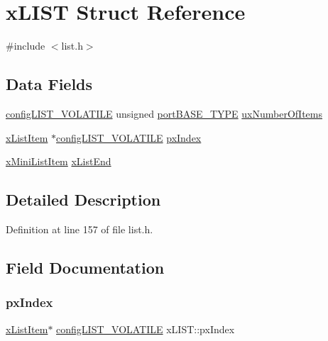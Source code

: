 \hypertarget{structxLIST}{}\section{x\+L\+I\+ST Struct Reference}
\label{structxLIST}


{\ttfamily \#include $<$list.\+h$>$}

\subsection*{Data Fields}
\begin{DoxyCompactItemize}
\item 
\hyperlink{list_8h_a2d5de557c5561c8980d1bf51d87d8cba}{config\+L\+I\+S\+T\+\_\+\+V\+O\+L\+A\+T\+I\+LE} unsigned \hyperlink{portmacro_8h_a1ebe82d24d764ae4e352f7c3a9f92c01}{port\+B\+A\+S\+E\+\_\+\+T\+Y\+PE} \hyperlink{structxLIST_a268fd44743a3b6d3cd4dd36a72a678fa}{ux\+Number\+Of\+Items}
\item 
\hyperlink{list_8h_abc3e65a10b5c5f39142e64e69311797f}{x\+List\+Item} $\ast$\hyperlink{list_8h_a2d5de557c5561c8980d1bf51d87d8cba}{config\+L\+I\+S\+T\+\_\+\+V\+O\+L\+A\+T\+I\+LE} \hyperlink{structxLIST_a7d75e67f799b751c7e37820df2172f63}{px\+Index}
\item 
\hyperlink{list_8h_a9fb3b8c76f89efd6b8787f66e94ba04c}{x\+Mini\+List\+Item} \hyperlink{structxLIST_a919ec0b26ba08c9787675b6161f7e318}{x\+List\+End}
\end{DoxyCompactItemize}


\subsection{Detailed Description}


Definition at line 157 of file list.\+h.



\subsection{Field Documentation}
\mbox{\label{structxLIST_a7d75e67f799b751c7e37820df2172f63}} 
\subsubsection{\texorpdfstring{px\+Index}{pxIndex}}
{\footnotesize\ttfamily \hyperlink{list_8h_abc3e65a10b5c5f39142e64e69311797f}{x\+List\+Item}$\ast$ \hyperlink{list_8h_a2d5de557c5561c8980d1bf51d87d8cba}{config\+L\+I\+S\+T\+\_\+\+V\+O\+L\+A\+T\+I\+LE} x\+L\+I\+S\+T\+::px\+Index}



